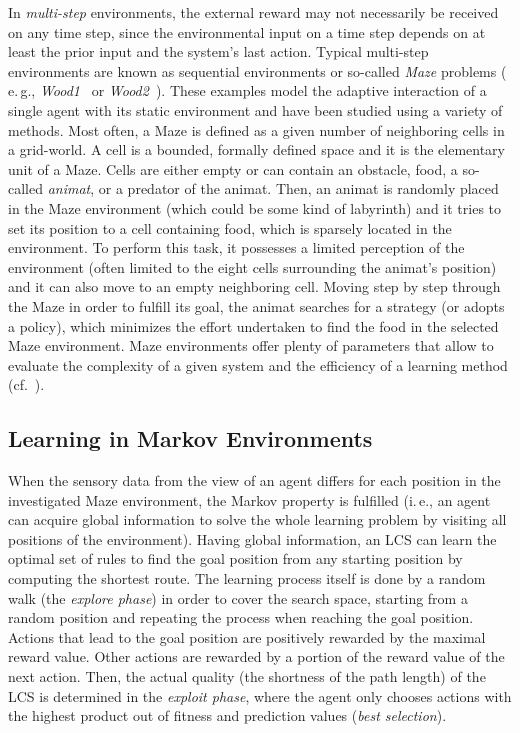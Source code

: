 \documentclass{sig-alternate}
\begin{document}
In \emph{multi-step} environments, the external reward may not necessarily be received on any time step, since the environmental input on a time step depends on at least the prior input and the system's last action. Typical multi-step environments are known as sequential environments or so-called \emph{Maze} problems ( e.\,g., \emph{Wood1}~\cite{Wil94} or \emph{Wood2}~\cite{Wil95}). These examples model the adaptive interaction of a single agent with its static environment and have been studied using a variety of methods. Most often, a Maze is defined as a given number of neighboring cells in a grid-world. A cell is a bounded, formally defined space and it is the elementary unit of a Maze. Cells are either empty or can contain an obstacle, food, a so-called \emph{animat}, or a predator of the animat. Then, an animat is randomly placed in the Maze environment (which could be some kind of labyrinth) and it tries to set its position to a cell containing food, which is sparsely located in the environment. To perform this task, it possesses a limited perception of the environment (often limited to the eight cells surrounding the animat's position) and it can also move to an empty neighboring cell. Moving step by step through the Maze in order to fulfill its goal, the animat searches for a strategy (or adopts a policy), which minimizes the effort undertaken to find the food in the selected Maze environment. Maze environments offer plenty of parameters that allow to evaluate the complexity of a given system and the efficiency of a learning method (cf.~\cite{BZ05}).

\subsection{Learning in Markov Environments} %
\label{subsection:learning-markov}

When the sensory data from the view of an agent differs for each position in the investigated Maze environment, the Markov property is fulfilled (i.\,e., an agent can acquire global information to solve the whole learning problem by visiting all positions of the environment). Having global information, an LCS can learn the optimal set of rules to find the goal position from any starting position by computing the shortest route. The learning process itself is done by a random walk (the \emph{explore phase}) in order to cover the search space, starting from a random position and repeating the process when reaching the goal position. Actions that lead to the goal position are positively rewarded by the maximal reward value. Other actions are rewarded by a portion of the reward value of the next action. Then, the actual quality (the shortness of the path length) of the LCS is determined in the \emph{exploit phase}, where the agent only chooses actions with the highest product out of fitness and prediction values (\emph{best selection}).
\end{document}

